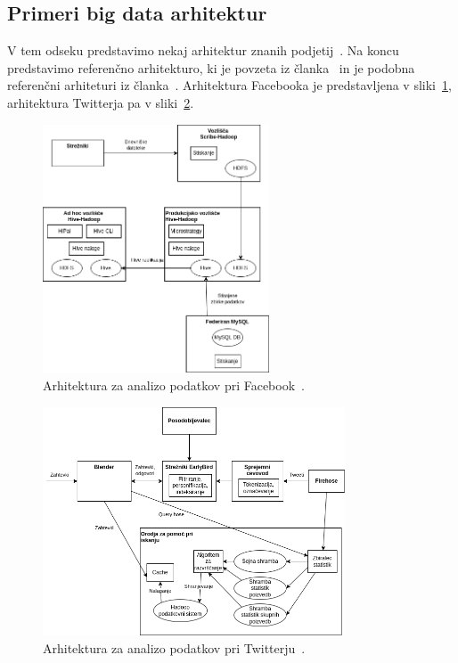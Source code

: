 \subsection{Primeri big data arhitektur}

V tem odseku predstavimo nekaj arhitektur znanih podjetij~\cite{reference_architecture_classification_technologies}.
Na koncu predstavimo referenčno arhitekturo,
ki je povzeta iz članka~\cite{reference_architecture_classification_technologies} in je
podobna referenčni arhiteturi iz članka~\cite{reference_architecture_bd}.
Arhitektura Facebooka je predstavljena v sliki~\ref{fig:arch-facebook}, arhitektura Twitterja pa v sliki~\ref{fig:arch-twitter}.

\begin{figure}[H]
    \centering
    \includegraphics[width=0.6\textwidth]{images/arhitektura/podjetja/facebook.png}
    \caption{Arhitektura za analizo podatkov pri Facebook~\cite{reference_architecture_classification_technologies}.}
    \label{fig:arch-facebook}
\end{figure}

\begin{figure}[H]
    \centering
    \includegraphics[width=0.8\textwidth]{images/arhitektura/podjetja/twitter.png}
    \caption{Arhitektura za analizo podatkov pri Twitterju~\cite{reference_architecture_classification_technologies}.}
    \label{fig:arch-twitter}
\end{figure}

